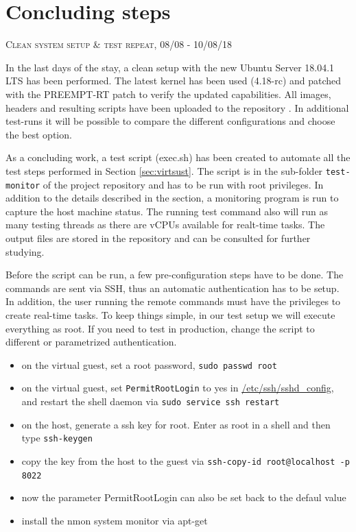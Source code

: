 \documentclass[]{scrartcl}
\begin{document}
\section{Concluding steps}

{\small\textsc{Clean system setup \& test repeat, 08/08 - 10/08/18} \bigskip}

In the last days of the stay, a clean setup with the new Ubuntu Server 18.04.1 LTS has been performed. The latest kernel has been used (4.18-rc) and patched with the PREEMPT-RT patch to verify the updated capabilities. All images, headers and resulting scripts have been uploaded to the repository \cite{gitrepo}. In additional test-runs it will be possible to compare the different configurations and choose the best option.

As a concluding work, a test script (exec.sh) has been created to automate all the test steps performed in Section \ref{sec:virtsust}. The script is in the sub-folder \texttt{test-monitor} of the project repository \cite{gitrepo} and has to be run with root privileges. In addition to the details described in the section, a monitoring program is run to capture the host machine status. The running test command also will run as many testing threads as there are vCPUs available for realt-time tasks. The output files are stored in the repository and can be consulted for further studying.

Before the script can be run, a few pre-configuration steps have to be done. The commands are sent via SSH, thus an automatic authentication has to be setup. In addition, the user running the remote commands must have the privileges to create real-time tasks. To keep things simple, in our test setup we will execute everything as root. If you need to test in production, change the script to different or parametrized authentication.

\begin{itemize}
	\item on the virtual guest, set a root password, \texttt{sudo passwd root}
	\item on the virtual guest, set \texttt{PermitRootLogin} to yes in \url{/etc/ssh/sshd_config}, and restart the shell daemon via \texttt{sudo service ssh restart}
	\item on the host, generate a ssh key for root. Enter as root in a shell and then type \texttt{ssh-keygen}
	\item copy the key from the host to the guest via \texttt{ssh-copy-id root@localhost -p 8022}
	\item now the parameter PermitRootLogin can also be set back to the defaul value
	\item install the nmon system monitor via apt-get
\end{itemize}
\end{document}

